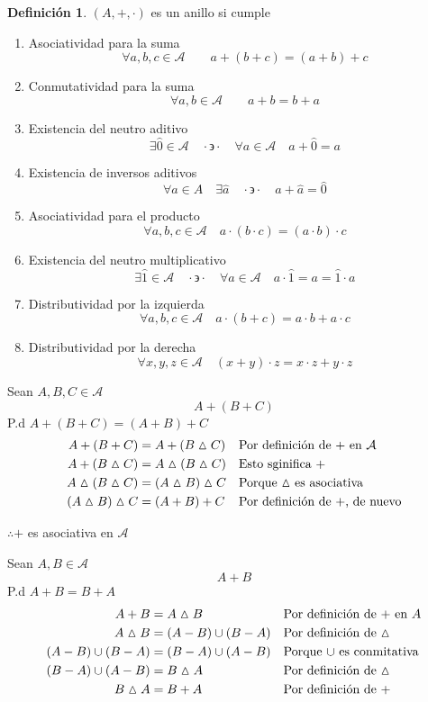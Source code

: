 \documentclass[letterpaper]{article}
\newcommand{\A}{\mathcal{A}}
\newcommand{\dsim}{\vartriangle}
\newcommand{\tq}{ \quad \cdot  \backepsilon \cdot \quad }
\renewcommand{\*}{\cdot}
\theoremstyle{definition}
\newtheorem{definition}{Definición}
\begin{document}
\begin{definition}
	$ (A, +, \*) $ es un anillo si cumple
	\begin{enumerate}
	\item Asociatividad para la suma
	\[ \forall a, b, c \in \A \qquad a+(b+c) = (a+b)+c \]
	\item Conmutatividad para la suma
	\[ \forall a, b \in \A \qquad a + b = b + a \]
	\item Existencia del neutro aditivo
	\[ \exists \hat{0} \in \A \tq \forall a \in \A \quad a + \hat{0} = a \]
	\item Existencia de inversos aditivos
	\[ \forall a \in A \quad \exists \hat{a} \tq a + \hat{a} = \hat{0} \]
	\item Asociatividad para el producto
	\[ \forall a, b, c \in \A \quad a \* (b \* c) = (a \* b )\* c \]
	\item Existencia del neutro multiplicativo
	\[ \exists \hat{1} \in \A \tq \forall a \in \A \quad a \* \hat{1} = a = \hat{1} \* a \]
	\item Distributividad por la izquierda
	\[ \forall a, b, c \in \A \quad a \* (b + c) = a \* b + a \* c \]
	\item Distributividad por la derecha
	\[ \forall x, y, z \in \A \quad (x + y) \* z = x \* z + y \* z \]
\end{enumerate}
\end{definition}
Sean $ A, B, C \in \A $
\[ A + (B + C) \] P.d $  A + (B + C) = (A+B) +C $
\begin{align*}
	A + (B + C) & = A +(B \dsim C) && \text{Por definición de + en $ \A $}\\
	A + (B \dsim C) &= A \dsim (B \dsim C) && \text{Esto sginifica $ + $}\\
	A \dsim (B \dsim C) &= (A \dsim B) \dsim C &&\text{Porque $ \dsim $ es asociativa}\\
	(A \dsim B) \dsim C &= (A + B) + C && \text{Por definición de +, de nuevo}
\end{align*}
\begin{center}
	$ \therefore + $ es asociativa en $ \A $
\end{center}
Sean $ A, B \in \A $
\[ A + B \] P.d $  A + B = B+A $
\begin{align*}
	A + B &= A \dsim B && \text{Por definición de $ + $ en $ A $}\\
	A \dsim B &= (A - B) \cup (B - A) && \text{Por definición de $ \dsim $}\\
	(A - B) \cup (B - A) &= (B - A) \cup (A - B)  && \text{Porque $ \cup $ es conmitativa}\\
	(B - A) \cup (A - B) &= B \dsim A  && \text{Por definición de $ \dsim $ }\\
	B \dsim A &= B + A  && \text{Por definición de $ + $ }\\
\end{align*}
\end{document}
